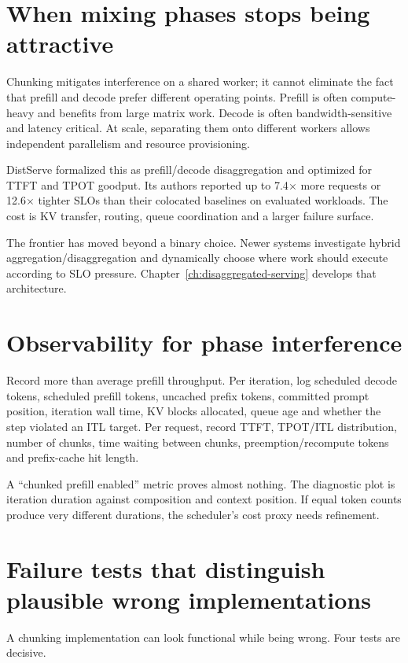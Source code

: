 \section{When mixing phases stops being attractive}

Chunking mitigates interference on a shared worker; it cannot eliminate the fact that
prefill and decode prefer different operating points. Prefill is often compute-heavy
and benefits from large matrix work. Decode is often bandwidth-sensitive and latency
critical. At scale, separating them onto different workers allows independent
parallelism and resource provisioning.

DistServe formalized this as prefill/decode disaggregation and optimized for TTFT and
TPOT goodput. Its authors reported up to 7.4$\times$ more requests or 12.6$\times$
tighter SLOs than their colocated baselines on evaluated workloads. The cost is KV
transfer, routing, queue coordination and a larger failure surface.

The frontier has moved beyond a binary choice. Newer systems investigate hybrid
aggregation/disaggregation and dynamically choose where work should execute according
to SLO pressure. Chapter~\ref{ch:disaggregated-serving} develops that architecture.

\section{Observability for phase interference}

Record more than average prefill throughput. Per iteration, log scheduled decode
tokens, scheduled prefill tokens, uncached prefix tokens, committed prompt position,
iteration wall time, KV blocks allocated, queue age and whether the step violated an
ITL target. Per request, record TTFT, TPOT/ITL distribution, number of chunks, time
waiting between chunks, preemption/recompute tokens and prefix-cache hit length.

A ``chunked prefill enabled'' metric proves almost nothing. The diagnostic plot is
iteration duration against composition and context position. If equal token counts
produce very different durations, the scheduler's cost proxy needs refinement.

\section{Failure tests that distinguish plausible wrong implementations}

A chunking implementation can look functional while being wrong. Four tests are
decisive.

